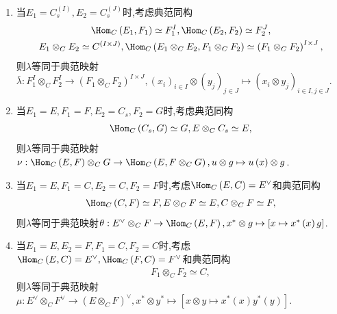 \begin{remark}{}{}
	\begin{enumerate}
		\item 当$E_{1}=C_{s}^{\left(I\right)},E_{2}=C_{s}^{\left(J\right)}$时,考虑典范同构
		\begin{gather*}
			\Hom_{C}\left(E_{1},F_{1}\right)\simeq F_{1}^{I},
			\Hom_{C}\left(E_{2},F_{2}\right)\simeq F_{2}^{J},\\
			E_{1}\otimes_{C}E_{2}\simeq C^{\left(I\times J\right)},
			\Hom_{C}\left(E_{1}\otimes_{C}E_{2},F_{1}\otimes_{C}F_{2}\right)\simeq\left(F_{1}\otimes_{C}F_{2}\right)^{I\times J},
		\end{gather*}
		则$\lambda$等同于典范映射$\bar{\lambda}:F_{1}^{I}\otimes_{C}F_{2}^{I}\to\left(F_{1}\otimes_{C}F_{2}\right)^{I\times J},\left(x_{i}\right)_{i\in I}\otimes\left(y_{j}\right)_{j\in J}\mapsto\left(x_{i}\otimes y_{j}\right)_{i\in I,j\in J}$.
		\item 当$E_{1}=E,F_{1}=F,E_{2}=C_{s},F_{2}=G$时,考虑典范同构
		\begin{align*}
			\Hom_{C}\left(C_{s},G\right)\simeq G,E\otimes_{C}C_{s}\simeq E,
		\end{align*}
		则$\lambda$等同于典范映射$\nu:\Hom_{C}\left(E,F\right)\otimes_{C}G\to\Hom_{C}\left(E,F\otimes_{C}G\right),u\otimes g\mapsto u\left(x\right)\otimes g$.
		\item 当$E_{1}=E,F_{1}=C,E_{2}=C,F_{2}=F$时,考虑$\Hom_{C}\left(E,C\right)=E^{\vee}$和典范同构
		\begin{align*}
			\Hom_{C}\left(C,F\right)\simeq F,E\otimes_{C}F\simeq E,C\otimes_{C}F\simeq F,
		\end{align*}
		则$\lambda$等同于典范映射$\theta:E^{\vee}\otimes_{C}F\to\Hom_{C}\left(E,F\right),x^{\ast}\otimes g\mapsto\left[x\mapsto x^{\ast}\left(x\right)g\right]$.
		\item 当$E_{1}=E,E_{2}=F,F_{1}=C,F_{2}=C$时,考虑$\Hom_{C}\left(E,C\right)=E^{\vee},\Hom_{C}\left(F,C\right)=F^{\vee}$和典范同构
		\begin{align*}
			F_{1}\otimes_{C}F_{2}\simeq C,
		\end{align*}
		则$\lambda$等同于典范映射$\mu:E^{\vee}\otimes_{C}F^{\vee}\to\left(E\otimes_{C}F\right)^{\vee},x^{\ast}\otimes y^{\ast}\mapsto\left[x\otimes y\mapsto x^{\ast}\left(x\right)y^{\ast}\left(y\right)\right]$.
	\end{enumerate}
\end{remark}

